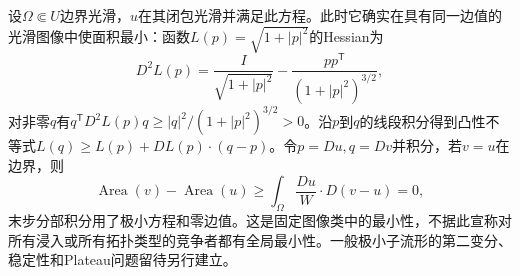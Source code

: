 设$\Omega\Subset U$边界光滑，$u$在其闭包光滑并满足此方程。此时它确实在具有同一边值的光滑图像中使面积最小：函数$L(p)=\sqrt{1+|p|^2}$的Hessian为
\[
 D^2L(p)=\frac{I}{\sqrt{1+|p|^2}}-
 \frac{pp^{\mathsf T}}{(1+|p|^2)^{3/2}},
\]
对非零$q$有$q^{\mathsf T}D^2L(p)q\geq |q|^2/(1+|p|^2)^{3/2}>0$。沿$p$到$q$的线段积分得到凸性不等式$L(q)\geq L(p)+DL(p)\cdot(q-p)$。令$p=Du,q=Dv$并积分，若$v=u$在边界，则
\[
 \operatorname{Area}(v)-\operatorname{Area}(u)
 \geq\int_\Omega\frac{Du}{W}\cdot D(v-u)=0,
\]
末步分部积分用了极小方程和零边值。这是固定图像类中的最小性，不据此宣称对所有浸入或所有拓扑类型的竞争者都有全局最小性。一般极小子流形的第二变分、稳定性和Plateau问题留待另行建立。
